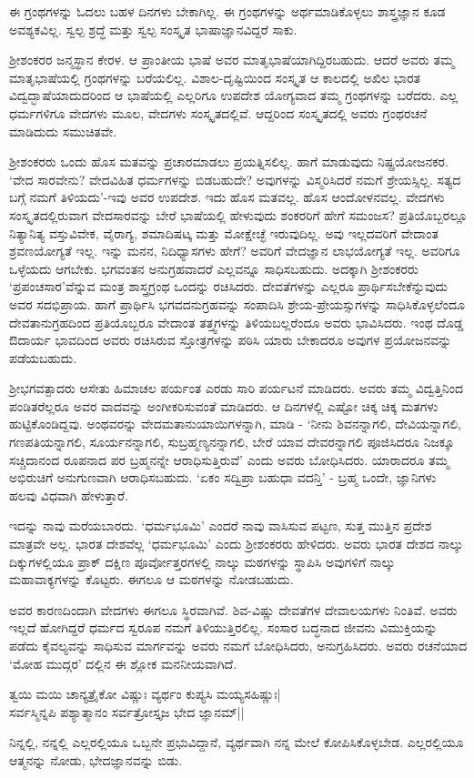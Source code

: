 ಈ ಗ್ರಂಥಗಳನ್ನು ಓದಲು ಬಹಳ ದಿನಗಳು ಬೇಕಾಗಿಲ್ಲ. ಈ ಗ್ರಂಥಗಳನ್ನು ಅರ್ಥಮಾಡಿಕೊಳ್ಳಲು ಶಾಸ್ತ್ರಜ್ಞಾನ ಕೂಡ ಅವಶ್ಯಕವಿಲ್ಲ. ಸ್ವಲ್ಪ ಶ್ರದ್ಧೆ ಮತ್ತು ಸ್ವಲ್ಪ ಸಂಸ್ಕೃತ ಭಾಷಾಜ್ಞಾನವಿದ್ದರೆ ಸಾಕು.

ಶ್ರೀಶಂಕರರ ಜನ್ಮಸ್ಥಾನ ಕೇರಳ. ಆ ಪ್ರಾಂತೀಯ ಭಾಷೆ ಅವರ ಮಾತೃಭಾಷೆಯಾಗಿದ್ದಿರಬಹುದು. ಆದರೆ ಅವರು ತಮ್ಮ ಮಾತೃಭಾಷೆಯಲ್ಲಿ ಗ್ರಂಥಗಳನ್ನು ಬರೆಯಲಿಲ್ಲ. ವಿಶಾಲ-ದೃಷ್ಟಿಯಿಂದ ಸಂಸ್ಕೃತ ಆ ಕಾಲದಲ್ಲಿ ಅಖಿಲ ಭಾರತ ವಿದ್ವದ್ಭಾಷೆಯಾದುದರಿಂದ ಆ ಭಾಷೆಯಲ್ಲಿ ಎಲ್ಲರಿಗೂ ಉಪದೇಶ ಯೋಗ್ಯವಾದ ತಮ್ಮ ಗ್ರಂಥಗಳನ್ನು ಬರೆದರು. ಎಲ್ಲ ಧರ್ಮಗಳಿಗೂ ವೇದಗಳು ಮೂಲ, ವೇದಗಳು ಸಂಸ್ಕೃತದಲ್ಲಿವೆ. ಆದ್ದರಿಂದ ಸಂಸ್ಕೃತದಲ್ಲಿ ಅವರು ಗ್ರಂಥರಚನೆ ಮಾಡಿದುದು ಸಮುಚಿತವೇ.

ಶ್ರೀಶಂಕರರು ಒಂದು ಹೊಸ ಮತವನ್ನು ಪ್ರಚಾರಮಾಡಲು ಪ್ರಯತ್ನಿಸಲಿಲ್ಲ. ಹಾಗೆ ಮಾಡುವುದು ನಿಷ್ಪ್ರಯೋಜನಕರ. `ವೇದ ಸಾರವೇನು? ವೇದವಿಹಿತ ಧರ್ಮಗಳನ್ನು ಬಿಡಬಹುದೇ? ಅವುಗಳನ್ನು ವಿಸ್ಮರಿಸಿದರೆ ನಮಗೆ ಶ್ರೇಯಸ್ಸಿಲ್ಲ. ಸತ್ಯದ ಬಗ್ಗೆ ನಮಗೆ ತಿಳಿಯದು'-ಇವು ಅವರ ಉಪದೇಶ. ಇದು ಹೊಸ ಮತವಲ್ಲ. ಹೊಸ ಆಂದೋಳನವಲ್ಲ. ವೇದಗಳು ಸಂಸ್ಕೃತದಲ್ಲಿರುವಾಗ ವೇದಸಾರವನ್ನು ಬೇರೆ ಭಾಷೆಯಲ್ಲಿ ಹೇಳುವುದು ಶಂಕರರಿಗೆ ಹೇಗೆ ಸಮಂಜಸ? ಪ್ರತಿಯೊಬ್ಬರಲ್ಲೂ ನಿತ್ಯಾನಿತ್ಯ ವಸ್ತುವಿವೇಕ, ವೈರಾಗ್ಯ, ಶಮಾದಿಷಟ್ಕ ಮತ್ತು ಮೋಕ್ಷೇಚ್ಛೆ ಇರುವುದಿಲ್ಲ. ಅವು ಇಲ್ಲದವರಿಗೆ ವೇದಾಂತ ಶ್ರವಣಯೋಗ್ಯತೆ ಇಲ್ಲ. ಇನ್ನು ಮನನ, ನಿದಿಧ್ಯಾಸಗಳು ಹೇಗೆ? ಅವರಿಗೆ ವೇದಜ್ಞಾನ ಲಾಭಯೋಗ್ಯತೆ ಇಲ್ಲ. ಅವರಿಗೂ ಒಳ್ಳೆಯದು ಆಗಬೇಕು. ಭಗವಂತನ ಅನುಗ್ರಹವಾದರೆ ಎಲ್ಲವನ್ನೂ ಸಾಧಿಸಬಹುದು. ಅದಕ್ಕಾಗಿ ಶ್ರೀಶಂಕರರು `ಪ್ರಪಂಚಸಾರ'ವೆನ್ನುವ ಮಂತ್ರ ಶಾಸ್ತ್ರಗ್ರಂಥ ಒಂದನ್ನು ರಚಿಸಿದರು. ದೇವತೆಗಳನ್ನು ಎಲ್ಲರೂ ಪ್ರಾರ್ಥಿಸಬೇಕೆನ್ನುವುದು ಅವರ ಸದಭಿಪ್ರಾಯ. ಹಾಗೆ ಪ್ರಾರ್ಥಿಸಿ ಭಗವದನುಗ್ರಹವನ್ನು ಸಂಪಾದಿಸಿ ಶ್ರೇಯ-ಪ್ರೇಯಸ್ಸುಗಳನ್ನು ಸಾಧಿಸಿಕೊಳ್ಳಲೆಂದೂ ದೇವತಾನುಗ್ರಹದಿಂದ ಪ್ರತಿಯೊಬ್ಬರೂ ವೇದಾಂತ ತತ್ತ್ವಗಳನ್ನು ತಿಳಿಯಬಲ್ಲರೆಂದೂ ಅವರು ಭಾವಿಸಿದರು. ಇಂಥ ದೊಡ್ಡ ಔದಾರ್ಯ ಭಾವದಿಂದ ಅವರು ರಚಿಸಿರುವ ಸ್ತೋತ್ರಗಳನ್ನು ಪಠಿಸಿ ಯಾರು ಬೇಕಾದರೂ ಅವುಗಳ ಪ್ರಯೋಜನವನ್ನು ಪಡೆಯಬಹುದು.

ಶ್ರೀಭಗವತ್ಪಾದರು ಆಸೇತು ಹಿಮಾಚಲ ಪರ್ಯಂತ ಎರಡು ಸಾರಿ ಪರ್ಯಟನೆ ಮಾಡಿದರು. ಅವರು ತಮ್ಮ ವಿದ್ವತ್ತಿನಿಂದ ಪಂಡಿತರೆಲ್ಲರೂ ಅವರ ವಾದವನ್ನು ಅಂಗೀಕರಿಸುವಂತೆ ಮಾಡಿದರು. ಆ ದಿನಗಳಲ್ಲಿ ಎಷ್ಟೋ ಚಿಕ್ಕ ಚಿಕ್ಕ ಮತಗಳು ಹುಟ್ಟಿಕೊಂಡಿದ್ದವು. ಅಂಥವರನ್ನು ವೇದಮತಾನುಯಾಯಿಗಳನ್ನಾಗಿ, ಮಾಡಿ - `ನೀನು ಶಿವನನ್ನಾಗಲಿ, ದೇವಿಯನ್ನಾಗಲಿ, ಗಣಪತಿಯನ್ನಾಗಲಿ, ಸೂರ್ಯನನ್ನಾಗಲಿ, ಸುಬ್ರಹ್ಮಣ್ಯನನ್ನಾಗಲಿ, ಬೇರೆ ಯಾವ ದೇವರನ್ನಾಗಲಿ ಪೂಜಿಸಿದರೂ ನಿಜಕ್ಕೂ ಸಚ್ಚಿದಾನಂದ ರೂಪನಾದ ಪರ ಬ್ರಹ್ಮನನ್ನೇ ಆರಾಧಿಸುತ್ತಿರುವೆ' ಎಂದು ಅವರು ಬೋಧಿಸಿದರು. ಯಾರಾದರೂ ತಮ್ಮ ಅಭಿರುಚಿಗೆ ಅನುಗುಣವಾಗಿ ಆರಾಧಿಸಬಹುದು. `ಏಕಂ ಸದ್ವಿಪ್ರಾ ಬಹುಧಾ ವದನ್ತಿ' - ಬ್ರಹ್ಮ ಒಂದೇ, ಜ್ಞಾನಿಗಳು ಹಲವು ವಿಧವಾಗಿ ಹೇಳುತ್ತಾರೆ.

ಇದನ್ನು ನಾವು ಮರೆಯಬಾರದು. `ಧರ್ಮಭೂಮಿ' ಎಂದರೆ ನಾವು ವಾಸಿಸುವ ಪಟ್ಟ‌ಣ, ಸುತ್ತ ಮುತ್ತಿನ ಪ್ರದೇಶ ಮಾತ್ರವೇ ಅಲ್ಲ. ಭಾರತ ದೇಶವೆಲ್ಲ `ಧರ್ಮಭೂಮಿ' ಎಂದು ಶ್ರೀಶಂಕರರು ಹೇಳಿದರು. ಅವರು ಭಾರತ ದೇಶದ ನಾಲ್ಕು ದಿಕ್ಕುಗಳಲ್ಲಿಯೂ ಪ್ರಾಕ್ ದಕ್ಷಿಣ ಪೂರ್ವೋತ್ತರಗಳಲ್ಲಿ ನಾಲ್ಕು ಮಠಗಳನ್ನು ಸ್ಥಾಪಿಸಿ ಅವುಗಳಿಗೆ ನಾಲ್ಕು ಮಹಾವಾಕ್ಯಗಳನ್ನು ಕೊಟ್ಟರು. ಈಗಲೂ ಆ ಮಠಗಳನ್ನು ನೋಡಬಹುದು.

ಅವರ ಕಾರಣದಿಂದಾಗಿ ವೇದಗಳು ಈಗಲೂ ಸ್ಥಿರವಾಗಿವೆ. ಶಿವ-ವಿಷ್ಣು ದೇವತೆಗಳ ದೇವಾಲಯಗಳು ನಿಂತಿವೆ. ಅವರು ಇಲ್ಲದೆ ಹೋಗಿದ್ದರೆ ಧರ್ಮದ ಸ್ವರೂಪ ನಮಗೆ ತಿಳಿಯುತ್ತಿರಲಿಲ್ಲ. ಸಂಸಾರ ಬದ್ಧನಾದ ಜೀವನು ವಿಮುಕ್ತಿಯನ್ನು ಪಡೆದು ಕೈವಲ್ಯವನ್ನು ಸಾಧಿಸುವ ಮಾರ್ಗವನ್ನು ಅವರು ನಮಗೆ ಬೋಧಿಸಿದರು, ಅನುಗ್ರಹಿಸಿದರು. ಅವರು ರಚನೆಯಾದ `ಮೋಹ ಮುದ್ಗರ' ದಲ್ಲಿನ ಈ ಶ್ಲೋಕ ಮನನೀಯವಾಗಿದೆ.

\begin{shloka}
ತ್ವಯಿ ಮಯಿ ಚಾನ್ಯತ್ರೈಕೋ ವಿಷ್ಣುಃ ವ್ಯರ್ಥಂ ಕುಪ್ಯಸಿ ಮಯ್ಯಸಹಿಷ್ಣುಃ|\\
ಸರ್ವಸ್ಮಿನ್ನಪಿ ಪಶ್ಯಾತ್ಮಾನಂ ಸರ್ವತ್ರೋಸ್ತೃಜ ಭೇದ ಜ್ಞಾನಮ್||
\end{shloka}

ನಿನ್ನಲ್ಲಿ, ನನ್ನಲ್ಲಿ ಎಲ್ಲರಲ್ಲಿಯೂ ಒಬ್ಬನೇ ಪ್ರಭುವಿದ್ದಾನೆ, ವ್ಯರ್ಥವಾಗಿ ನನ್ನ ಮೇಲೆ ಕೋಪಿಸಿಕೊಳ್ಳಬೇಡ. ಎಲ್ಲರಲ್ಲಿಯೂ ಆತ್ಮನನ್ನು ನೋಡು, ಭೇದಜ್ಞಾನವನ್ನು ಬಿಡು.

